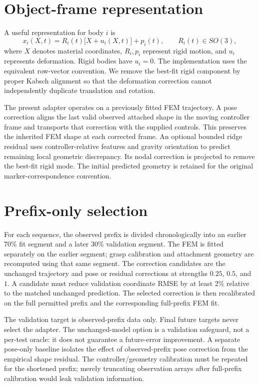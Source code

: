 \documentclass[10pt]{article}
\begin{document}
\section{Object-frame representation}
A useful representation for body $i$ is
\begin{equation}
 x_i(X,t)=R_i(t)\bigl[X+u_i(X,t)\bigr]+p_i(t),\qquad R_i(t)\in SO(3),
\end{equation}
where $X$ denotes material coordinates, $R_i,p_i$ represent rigid motion, and $u_i$ represents deformation. Rigid bodies have $u_i=0$. The implementation uses the equivalent row-vector convention. We remove the best-fit rigid component by proper Kabsch alignment so that the deformation correction cannot independently duplicate translation and rotation.

The present adapter operates on a previously fitted FEM trajectory. A pose correction aligns the last valid observed attached shape in the moving controller frame and transports that correction with the supplied controls. This preserves the inherited FEM shape at each corrected frame. An optional bounded ridge residual uses controller-relative features and gravity orientation to predict remaining local geometric discrepancy. Its nodal correction is projected to remove the best-fit rigid mode. The initial predicted geometry is retained for the original marker-correspondence convention.

\section{Prefix-only selection}
For each sequence, the observed prefix is divided chronologically into an earlier 70\% fit segment and a later 30\% validation segment. The FEM is fitted separately on the earlier segment; grasp calibration and attachment geometry are recomputed using that same segment. The correction candidates are the unchanged trajectory and pose or residual corrections at strengths $0.25$, $0.5$, and $1$. A candidate must reduce validation coordinate RMSE by at least 2\% relative to the matched unchanged prediction. The selected correction is then recalibrated on the full permitted prefix and the corresponding full-prefix FEM fit.

The validation target is observed-prefix data only. Final future targets never select the adapter. The unchanged-model option is a validation safeguard, not a per-test oracle: it does not guarantee a future-error improvement. A separate pose-only baseline isolates the effect of observed-prefix pose correction from the empirical shape residual. The controller/geometry calibration must be repeated for the shortened prefix; merely truncating observation arrays after full-prefix calibration would leak validation information.
\end{document}
